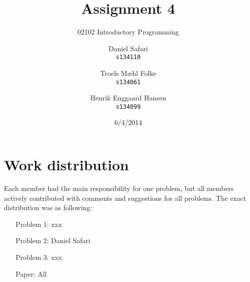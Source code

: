 \documentclass{scrartcl}
\begin{document}

\title{Assignment 4}
\subtitle{02102 Introductory Programming}
\author{
  Daniel Safari\\
  \texttt{s134110}
  \and
  Troels Mæhl Folke\\
  \texttt{s134061}
   \and
  Henrik Enggaard Hansen\\
  \texttt{s134099}
}
\date{6/4/2014}
\maketitle
\thispagestyle{empty}
\setcounter{page}{0}
\null
\vfill
\section*{Work distribution}

Each member had the main responsibility for one problem, but all members
actively contributed with comments and suggestions for all problems. 
The exact distribution was as following:
\begin{itemize}
\setlength{\itemindent}{3em}
\item[Problem 1:] xxx
\item[Problem 2:] Daniel Safari
\item[Problem 3:] xxx
\item[Paper:]  All
\end{itemize}
\newpage






\end{document}
